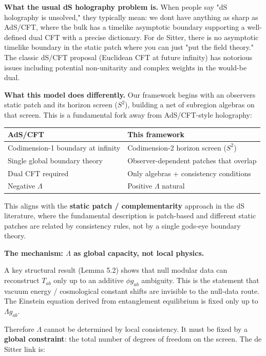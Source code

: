\textbf{What the usual dS holography problem is.} When people say "dS holography is unsolved," they typically mean: we don\textquotesingle t have anything as sharp as AdS/CFT, where the bulk has a timelike asymptotic boundary supporting a well-defined dual CFT with a precise dictionary. For de Sitter, there is no asymptotic timelike boundary in the static patch where you can just "put the field theory." The classic dS/CFT proposal (Euclidean CFT at future infinity) has notorious issues including potential non-unitarity and complex weights in the would-be dual.

\textbf{What this model does differently.} Our framework begins with an observer\textquotesingle s static patch and its horizon screen (\(S^2\)), building a net of subregion algebras on that screen. This is a fundamental fork away from AdS/CFT-style holography:

{\def\LTcaptype{none} %
\begin{longtable}[]{@{}ll@{}}
\toprule\noalign{}
AdS/CFT & This framework \\
\midrule\noalign{}
\endhead
\bottomrule\noalign{}
\endlastfoot
Codimension-1 boundary at infinity & Codimension-2 horizon screen (\(S^2\)) \\
Single global boundary theory & Observer-dependent patches that overlap \\
Dual CFT required & Only algebras + consistency conditions \\
Negative \(\Lambda\) & Positive \(\Lambda\) natural \\
\end{longtable}
}

This aligns with the \textbf{static patch / complementarity} approach in the dS literature, where the fundamental description is patch-based and different static patches are related by consistency rules, not by a single god\textquotesingle s-eye boundary theory.

\textbf{The mechanism: \(\Lambda\) as global capacity, not local physics.}

A key structural result (Lemma 5.2) shows that null modular data can reconstruct \(T_{ab}\) only up to an additive \(\phi g_{ab}\) ambiguity. This is the statement that vacuum energy / cosmological constant shifts are invisible to the null-data route. The Einstein equation derived from entanglement equilibrium is fixed only up to \(\Lambda g_{ab}\).

Therefore \(\Lambda\) cannot be determined by local consistency. It must be fixed by a \textbf{global constraint}: the total number of degrees of freedom on the screen. The de Sitter link is:

